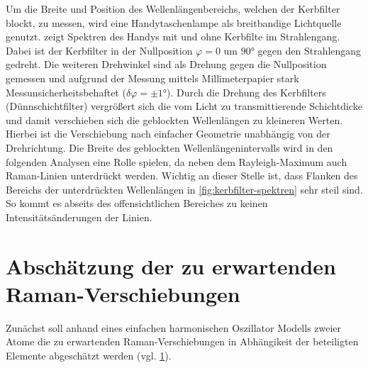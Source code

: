 \documentclass[../bericht.tex]{subfiles}
\begin{document}
        Um die Breite und Position des Wellenlängenbereichs, welchen der Kerbfilter blockt, zu messen, wird eine Handytaschenlampe als breitbandige Lichtquelle genutzt.  zeigt Spektren des Handys mit und ohne Kerbfilte im Strahlengang. Dabei ist der Kerbfilter in der Nullposition $\varphi=0$ um $\ang{90}$ gegen den Strahlengang gedreht. Die weiteren Drehwinkel sind als Drehung gegen die Nullposition gemessen und aufgrund der Messung mittels Millimeterpapier stark Messunsicherheitsbehaftet ($\delta \varphi=\pm \ang{1}$). Durch die Drehung des Kerbfilters (Dünnschichtfilter) vergrößert sich die vom Licht zu transmittierende Schichtdicke und damit verschieben sich die geblockten Wellenlängen zu kleineren Werten. Hierbei ist die Verschiebung nach einfacher Geometrie unabhängig von der Drehrichtung. Die Breite des geblockten Wellenlängenintervalls wird in den folgenden Analysen eine Rolle spielen, da neben dem Rayleigh-Maximum auch Raman-Linien unterdrückt werden. Wichtig an dieser Stelle ist, dass Flanken des Bereichs der unterdrückten Wellenlängen in \cref{fig:kerbfilter-spektren} sehr steil sind. So kommt es abseits des offensichtlichen Bereiches zu keinen Intensitätsänderungen der Linien.


    \section{Abschätzung der zu erwartenden Raman-Verschiebungen}
    \label{subsec:harm-oszi-absch}

      Zunächst soll anhand eines einfachen harmonischen Oszillator Modells zweier Atome die zu erwartenden Raman-Verschiebungen in Abhängikeit der beteiligten Elemente abgeschätzt werden (vgl. \cref{subsec:harm-oszi-absch}).
\end{document}

